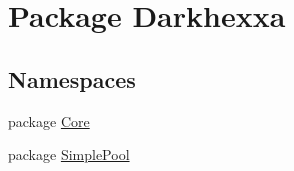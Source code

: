 \hypertarget{namespace_darkhexxa}{\section{Package Darkhexxa}
\label{namespace_darkhexxa}
}
\subsection*{Namespaces}
\begin{DoxyCompactItemize}
\item 
package \hyperlink{namespace_darkhexxa_1_1_core}{Core}
\item 
package \hyperlink{namespace_darkhexxa_1_1_simple_pool}{Simple\-Pool}
\end{DoxyCompactItemize}
